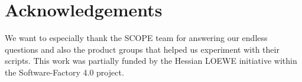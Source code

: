 \documentclass[sigconf]{acmart}
\begin{document}
%
%





\maketitle











\section*{Acknowledgements}
We want to especially thank the SCOPE team for answering our endless questions and also the product groups that helped us experiment with their scripts. This work was partially funded by the Hessian LOEWE initiative within the Software-Factory 4.0 project.


 
\end{document}
